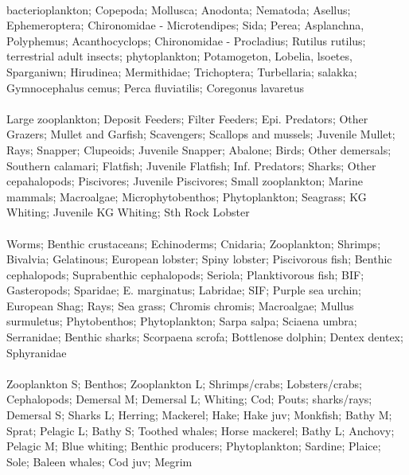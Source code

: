 \fullhline
\hline
{} \\
\hline
bacterioplankton; Copepoda; Mollusca; Anodonta; Nematoda; Asellus; Ephemeroptera; Chironomidae - Microtendipes; Sida; Perea; Asplanchna, Polyphemus; Acanthocyclops; Chironomidae - Procladius; Rutilus rutilus; terrestrial adult insects; phytoplankton; Potamogeton, Lobelia, lsoetes, Sparganiwn; Hirudinea; Mermithidae; Trichoptera; Turbellaria; salakka; Gymnocephalus cemus; Perca fluviatilis; Coregonus lavaretus\\
\fullhline
\hline
{} \\
\hline
Large zooplankton; Deposit Feeders; Filter Feeders; Epi. Predators; Other Grazers; Mullet and Garfish; Scavengers; Scallops and mussels; Juvenile Mullet; Rays; Snapper; Clupeoids; Juvenile Snapper; Abalone; Birds; Other demersals; Southern calamari; Flatfish; Juvenile Flatfish; Inf. Predators; Sharks; Other cepahalopods; Piscivores; Juvenile Piscivores; Small zooplankton; Marine mammals; Macroalgae; Microphytobenthos; Phytoplankton; Seagrass; KG Whiting; Juvenile KG Whiting; Sth Rock Lobster\\
\fullhline
\hline
{} \\
\hline
Worms; Benthic crustaceans; Echinoderms; Cnidaria; Zooplankton; Shrimps; Bivalvia; Gelatinous; European lobster; Spiny lobster; Piscivorous fish; Benthic cephalopods; Suprabenthic cephalopods; Seriola; Planktivorous fish; BIF; Gasteropods; Sparidae; E. marginatus; Labridae; SIF; Purple sea urchin; European Shag; Rays; Sea grass; Chromis chromis; Macroalgae; Mullus surmuletus; Phytobenthos; Phytoplankton; Sarpa salpa; Sciaena umbra; Serranidae; Benthic sharks; Scorpaena scrofa; Bottlenose dolphin; Dentex dentex; Sphyranidae\\
\fullhline
\hline
{} \\
\hline
Zooplankton S; Benthos; Zooplankton L; Shrimps/crabs; Lobsters/crabs; Cephalopods; Demersal M; Demersal L; Whiting; Cod; Pouts; sharks/rays; Demersal S; Sharks L; Herring; Mackerel; Hake; Hake juv; Monkfish; Bathy M; Sprat; Pelagic L; Bathy S; Toothed whales; Horse mackerel; Bathy L; Anchovy; Pelagic M; Blue whiting; Benthic producers; Phytoplankton; Sardine; Plaice; Sole; Baleen whales; Cod juv; Megrim\\
